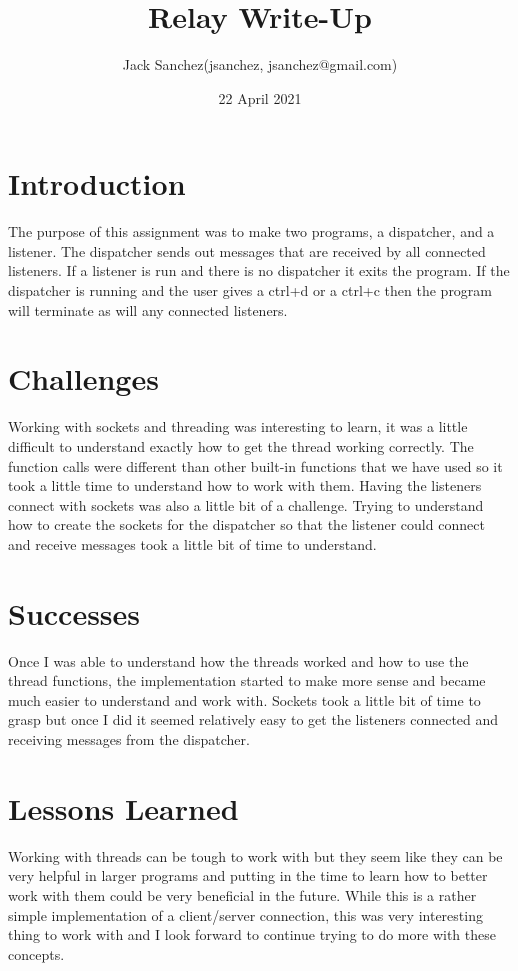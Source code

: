 \documentclass{article}
\title{Relay Write-Up}
\author{Jack Sanchez(jsanchez, jsanchez@gmail.com)}
\date{22 April 2021}
\begin{document}
\maketitle

\section{Introduction}
The purpose of this assignment was to make two programs, a dispatcher, and a listener. The dispatcher sends out messages that are received by all connected listeners. If a listener is run and there is no dispatcher it exits the program. If the dispatcher is running and the user gives a ctrl+d or a ctrl+c then the program will terminate as will any connected listeners.

\section{Challenges}
Working with sockets and threading was interesting to learn, it was a little difficult to understand exactly how to get the thread working correctly. The function calls were different than other built-in functions that we have used so it took a little time to understand how to work with them.
Having the listeners connect with sockets was also a little bit of a challenge. Trying to understand how to create the sockets for the dispatcher so that the listener could connect and receive messages took a little bit of time to understand.

\section{Successes}
Once I was able to understand how the threads worked and how to use the thread functions, the implementation started to make more sense and became much easier to understand and work with.
Sockets took a little bit of time to grasp but once I did it seemed relatively easy to get the listeners connected and receiving messages from the dispatcher.

\section{Lessons Learned}
Working with threads can be tough to work with but they seem like they can be very helpful in larger programs and putting in the time to learn how to better work with them could be very beneficial in the future. While this is a rather simple implementation of a client/server connection, this was very interesting thing to work with and I look forward to continue trying to do more with these concepts.
\end{document}
